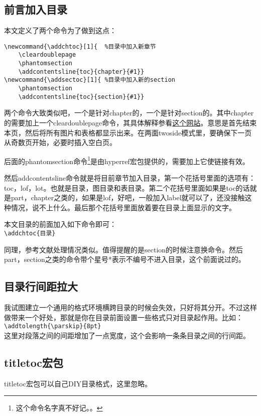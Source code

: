 \subsection{前言加入目录}
本文定义了两个命令为了做到这点：
\begin{verbatim}
\newcommand{\addchtoc}[1]{  %目录中加入新章节
	\cleardoublepage   
	\phantomsection    
	\addcontentsline{toc}{chapter}{#1}}
\newcommand{\addsectoc}[1]{ %目录中加入新的section
	\phantomsection    
	\addcontentsline{toc}{section}{#1}}	
\end{verbatim}
两个命令大致类似吧，一个是针对chapter的，一个是针对section的。其中chapter的需要加上一个cleardoublepage命令，其具体解释参看\href{http://www.personal.ceu.hu/tex/breaking.htm#clrdblpage}{这个网站}。意思是首先结束本页，然后将所有图片和表格都显示出来。在两面twoside模式里，要确保下一页从奇数页开始，必要时插入空白页。

后面的phantomsection命令\footnote{这个命令名字真不好记。。}是由hyperref宏包提供的，需要加上它使链接有效。     

然后addcontentsline命令就是将目前章节加入目录，第一个花括号里面的选项有：toc，lof，lot。也就是目录，图目录和表目录。第二个花括号里面如果是toc的话就是part，chapter之类的，如果是lof，好吧，一般加入label就可以了，还没接触这种情况，说不上什么。最后那个花括号里面放着要在目录上面显示的文字。

本文目录的前面加入如下命令即可：\\
\verb+\addchtoc{目录}+

同理，参考文献处理情况类似。值得提醒的是section的时候注意换命令。然后part，section之类的命令带个星号*表示不编号不进入目录，这个前面说过的。

\subsection{目录行间距拉大}
我试图建立一个通用的格式环境横跨目录的时候会失效，只好将其分开。不过这样做带来一个好处，那就是你在目录前面设置一些格式只对目录起作用。比如：\\
\verb+\addtolength{\parskip}{8pt}+\\
这里对段落之间的间距增加了一点宽度，这个会影响一条条目录之间的行间距。

\subsection{titletoc宏包}
titletoc宏包可以自己DIY目录格式，这里忽略。


